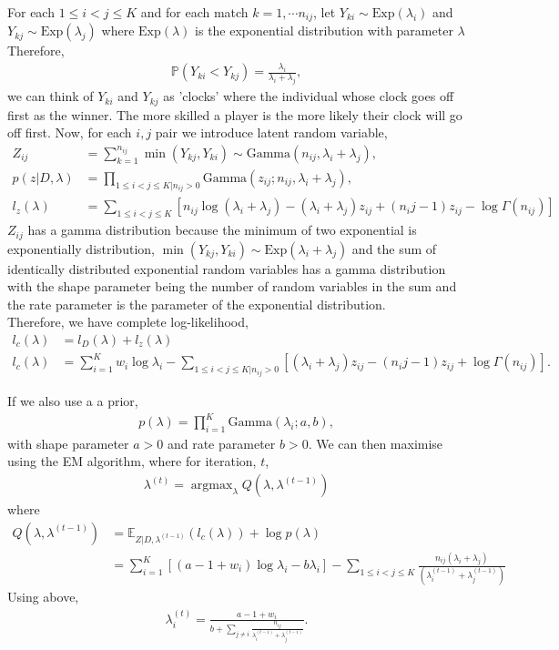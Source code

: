 \documentclass[11pt]{article}
\DeclareMathOperator*{\argmax}{argmax}
\numberwithin{equation}{section}
\begin{document}
For each $1 \leq i<j \leq K$ and for each match $k=1, \cdots n_{ij}$, let $Y_{ki} \sim \mathrm{Exp} (\lambda_i)$ and $Y_{kj} \sim \mathrm{Exp}(\lambda_j)$ where $\mathrm{Exp}(\lambda)$ is the exponential distribution with parameter $\lambda$ Therefore, 
\begin{align}
\mathbb{P}(Y_{ki} < Y_{kj}) = \frac{\lambda_i}{\lambda_i + \lambda_j},
\end{align}
we can think of $Y_{ki}$ and $Y_{kj}$ as 'clocks' where the individual whose clock goes off first as the winner. The more skilled a player is the more likely their clock will go off first. Now, for each $i,j$ pair we introduce latent random variable, 
\begin{align} \label{latentrv}
Z_{ij} &= \sum _{k=1}^{n_{ij}} \min (Y_{kj},Y_{ki}) \sim \mathrm{Gamma} (n_{ij}, \lambda _i + \lambda _j),\\
p(z|D,\lambda) &= \prod _{1 \leq i<j \leq K | n_{ij} >0} \mathrm{Gamma} (z_{ij} ; n_{ij}, \lambda_i + \lambda_j), \\
l_z(\lambda) &= \sum _{1 \leq i<j \leq K}[n_{ij}\log (\lambda_i + \lambda_j) - (\lambda_i + \lambda_j)z_{ij} + (n_ij -1)z_{ij} - \log \Gamma (n_{ij})]
\end{align}
$Z_{ij}$ has a gamma distribution because the minimum of two exponential  is exponentially distribution, $\min (Y_{kj},Y_{ki}) \sim \mathrm{Exp}(\lambda _i + \lambda _j)$ and the sum of identically distributed exponential random variables has a gamma distribution with the shape parameter being the number of random variables in the sum and the rate parameter is the parameter of the exponential distribution. \\ 

Therefore, we have complete log-likelihood, 
\begin{align}
l_c(\lambda) &= l_D(\lambda) + l_z(\lambda) \\
l_c(\lambda) &= \sum _{i=1}^K w_i\log \lambda_i - \sum _{1 \leq i<j \leq K | n_{ij} >0} [(\lambda_i + \lambda_j)z_{ij} - (n_ij -1)z_{ij} + \log \Gamma (n_{ij})].
\end{align}

If we also use a a prior, 
\begin{align}
p(\lambda) = \prod _{i=1}^K \mathrm{Gamma}(\lambda_i ; a,b),
\end{align}
with shape parameter $a>0$ and rate parameter $b>0$. We can then maximise using the EM algorithm, where for iteration, $t$,
\begin{align}
\lambda^{(t)} = \argmax _{\lambda} Q(\lambda,\lambda^{(t-1)})
\end{align}
where 
\begin{align}
Q(\lambda,\lambda^{(t-1)}) &= \mathbb{E}_{Z|D, \lambda^{(t-1)}} (l_c(\lambda)) + \log p(\lambda) \\
&= \sum _{i=1}^K[(a-1+w_i)\log \lambda_i -b\lambda_i] - \sum _{1 \leq i<j \leq K} \frac{n_{ij}(\lambda_i + \lambda_j)}{(\lambda_i^{(t-1)} + \lambda_j^{(t-1)})}
\end{align}
Using above, 
\begin{align}
\lambda_i ^{(t)} = \frac{a-1+w_i}{b + \sum_{j \neq i}\frac{n_{ij}}{\lambda_i^{(t-1)}+\lambda_j^{(t-1)}}}.
\end{align}
\end{document}
